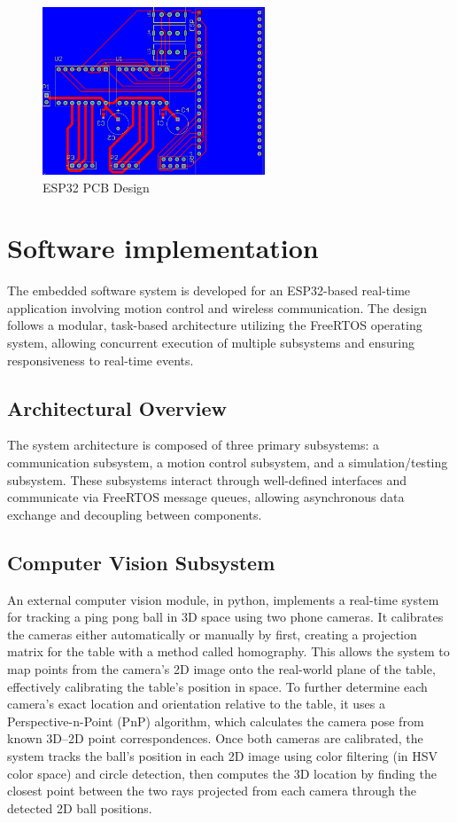 \begin{figure}[h]
	\centering\includegraphics[height=5cm]{./images/ESP32_pcb}
	\caption{ESP32 PCB Design}
	\label{fig:esp-pcb}
\end{figure}


\section{Software implementation}

The embedded software system is developed for an ESP32-based real-time application involving motion control and wireless communication. The design follows a modular, task-based architecture utilizing the FreeRTOS operating system, allowing concurrent execution of multiple subsystems and ensuring responsiveness to real-time events.

\subsection{Architectural Overview}
The system architecture is composed of three primary subsystems: a communication subsystem, a motion control subsystem, and a simulation/testing subsystem. These subsystems interact through well-defined interfaces and communicate via FreeRTOS message queues, allowing asynchronous data exchange and decoupling between components.

\subsection{Computer Vision Subsystem}
An external computer vision module, in python, implements a real-time system for tracking a ping pong ball in 3D space using two phone cameras. It calibrates the cameras either automatically or manually by first, creating a projection matrix for the table with a method called homography. This allows the system to map points from the camera’s 2D image onto the real-world plane of the table, effectively calibrating the table’s position in space. To further determine each camera’s exact location and orientation relative to the table, it uses a Perspective-n-Point (PnP) algorithm, which calculates the camera pose from known 3D–2D point correspondences. Once both cameras are calibrated, the system tracks the ball’s position in each 2D image using color filtering (in HSV color space) and circle detection, then computes the 3D location by finding the closest point between the two rays projected from each camera through the detected 2D ball positions.


